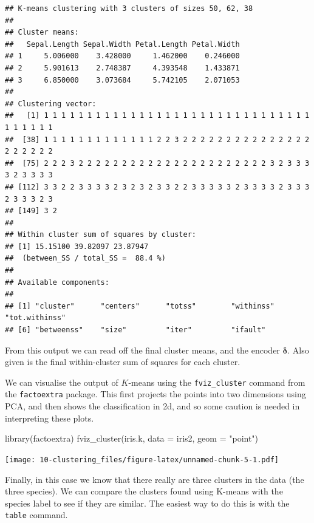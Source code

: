 \documentclass[
]{book}
\newenvironment{Shaded}{\begin{snugshade}}{\end{snugshade}}
\newcommand{\AttributeTok}[1]{\textcolor[rgb]{0.77,0.63,0.00}{#1}}
\newcommand{\FunctionTok}[1]{\textcolor[rgb]{0.00,0.00,0.00}{#1}}
\newcommand{\NormalTok}[1]{#1}
\newcommand{\SpecialCharTok}[1]{\textcolor[rgb]{0.00,0.00,0.00}{#1}}
\newcommand{\StringTok}[1]{\textcolor[rgb]{0.31,0.60,0.02}{#1}}
\theoremstyle{definition}
\theoremstyle{definition}
\theoremstyle{definition}
\theoremstyle{definition}
\theoremstyle{remark}
\begin{document}
\begin{verbatim}
## K-means clustering with 3 clusters of sizes 50, 62, 38
## 
## Cluster means:
##   Sepal.Length Sepal.Width Petal.Length Petal.Width
## 1     5.006000    3.428000     1.462000    0.246000
## 2     5.901613    2.748387     4.393548    1.433871
## 3     6.850000    3.073684     5.742105    2.071053
## 
## Clustering vector:
##   [1] 1 1 1 1 1 1 1 1 1 1 1 1 1 1 1 1 1 1 1 1 1 1 1 1 1 1 1 1 1 1 1 1 1 1 1 1 1
##  [38] 1 1 1 1 1 1 1 1 1 1 1 1 1 2 2 3 2 2 2 2 2 2 2 2 2 2 2 2 2 2 2 2 2 2 2 2 2
##  [75] 2 2 2 3 2 2 2 2 2 2 2 2 2 2 2 2 2 2 2 2 2 2 2 2 2 2 3 2 3 3 3 3 2 3 3 3 3
## [112] 3 3 2 2 3 3 3 3 2 3 2 3 2 3 3 2 2 3 3 3 3 3 2 3 3 3 3 2 3 3 3 2 3 3 3 2 3
## [149] 3 2
## 
## Within cluster sum of squares by cluster:
## [1] 15.15100 39.82097 23.87947
##  (between_SS / total_SS =  88.4 %)
## 
## Available components:
## 
## [1] "cluster"      "centers"      "totss"        "withinss"     "tot.withinss"
## [6] "betweenss"    "size"         "iter"         "ifault"
\end{verbatim}

From this output we can read off the final cluster means, and the encoder \(\boldsymbol \delta\). Also given is the final within-cluster sum of squares for each cluster.

We can visualise the output of \(K\)-means using the \texttt{fviz\_cluster} command from the \texttt{factoextra} package. This first projects the points into two dimensions using PCA, and then shows the classification in 2d, and so some caution is needed in interpreting these plots.

\begin{Shaded}
\begin{Highlighting}[]
\FunctionTok{library}\NormalTok{(factoextra)}
\FunctionTok{fviz\_cluster}\NormalTok{(iris.k, }\AttributeTok{data =}\NormalTok{ iris2,}
             \AttributeTok{geom =} \StringTok{"point"}\NormalTok{)}
\end{Highlighting}
\end{Shaded}

\texttt{[image: 10-clustering\_files/figure-latex/unnamed-chunk-5-1.pdf]}

Finally, in this case we know that there really are three clusters in the data (the three species). We can compare the clusters found using K-means with the species label to see if they are similar. The easiest way to do this is with the \texttt{table} command.

\begin{Shaded}
\end{Shaded}
\end{document}

